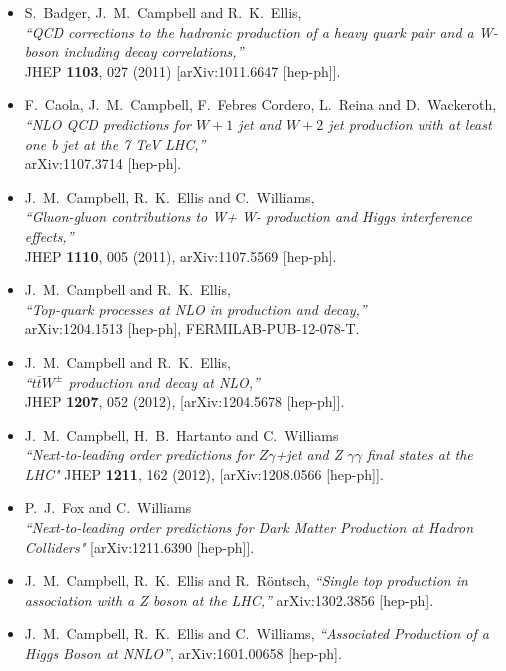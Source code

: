 \documentclass{article}
\begin{document}
{{{{{{\begin{itemize}
  [arXiv:1001.4495 [hep-ph]].
\item S.~Badger, J.~M.~Campbell and R.~K.~Ellis, \\
  {\it ``QCD corrections to the hadronic production of a heavy quark pair and a  W-boson including decay correlations,''} \\
 JHEP {\bf 1103}, 027 (2011)
  [arXiv:1011.6647 [hep-ph]].
\item F.~Caola, J.~M.~Campbell, F.~Febres Cordero, L.~Reina and D.~Wackeroth, \\
  {\it ``NLO QCD predictions for $W+1$ jet and $W+2$ jet production with at least one b jet at the 7 TeV LHC,''} \\
    arXiv:1107.3714 [hep-ph].
\item J.~M.~Campbell, R.~K.~Ellis and C.~Williams, \\
  {\it ``Gluon-gluon contributions to W+ W- production and Higgs interference effects,''} \\
  JHEP {\bf 1110}, 005 (2011),
  arXiv:1107.5569 [hep-ph].
\item J.~M.~Campbell and R.~K.~Ellis, \\
  {\it ``Top-quark processes at NLO in production and decay,''} \\
  arXiv:1204.1513 [hep-ph], FERMILAB-PUB-12-078-T.
\item J.~M.~Campbell and R.~K.~Ellis, \\
  {\it ``$t \bar{t} W^{\pm}$ production and decay at NLO,''} \\
  JHEP {\bf 1207}, 052 (2012), [arXiv:1204.5678 [hep-ph]].
\item
 J.~M.~Campbell, H.~B.~Hartanto and C.~Williams\\
  {\it {``Next-to-leading order predictions for $Z \gamma$+jet and
          Z $\gamma \gamma$ final states at the LHC"}}
   JHEP {\bf 1211}, 162 (2012), [arXiv:1208.0566 [hep-ph]].	
\item
 P.~J.~Fox  and C.~Williams\\
      {\it {``Next-to-leading order predictions for Dark Matter Production at Hadron Colliders"}}
                        	 [arXiv:1211.6390 [hep-ph]].	 
\item
  J.~M.~Campbell, R.~K.~Ellis and R.~R{\"o}ntsch,
  {\it ``Single top production in association with a Z boson at the LHC,''}
  arXiv:1302.3856 [hep-ph].

\item
 J.~M.~Campbell, R.~K.~Ellis and C.~Williams,
 {\it ``Associated Production of a Higgs Boson at NNLO''},
  arXiv:1601.00658 [hep-ph].
  

\end{itemize}}}}}}}
\end{document}
